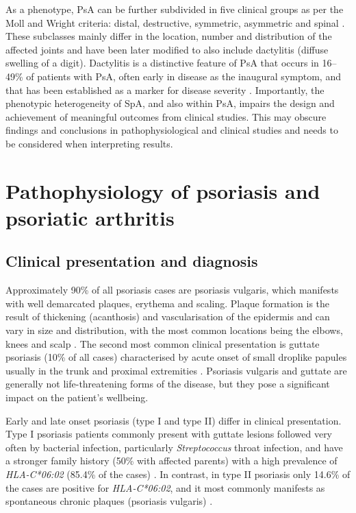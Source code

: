 As a phenotype, PsA can be further subdivided in five clinical groups as per the Moll and Wright criteria: distal, destructive, symmetric, asymmetric and spinal \parencite{Moll1973}. These subclasses mainly differ in the location, number and distribution of the affected joints and have been later modified to also include dactylitis (diffuse swelling of a digit). Dactylitis is a distinctive feature of PsA that occurs in 16–49\% of patients with PsA, often early in disease as the inaugural symptom, and that has been established as a marker for disease severity \parencite{Reich2012}. Importantly, the phenotypic heterogeneity of SpA, and also within PsA, impairs the design and achievement of meaningful outcomes from clinical studies. This may obscure findings and conclusions in pathophysiological and clinical studies and needs to be considered when interpreting results.



\section{Pathophysiology of psoriasis and psoriatic arthritis}

\subsection{Clinical presentation and diagnosis}
%
Approximately 90\% of all psoriasis cases are psoriasis vulgaris, which manifests with well demarcated plaques, erythema and scaling. Plaque formation is the result of thickening (acanthosis) and vascularisation of the epidermis and can vary in size and distribution, with the most common locations being the elbows, knees and scalp \parencite{Perera2012,Griffiths2007}. The second most common clinical presentation is guttate psoriasis  (10\% of all cases) characterised by acute onset of small droplike papules usually in the trunk and proximal extremities \parencite{Vence2015}. Psoriasis vulgaris and guttate are generally not life-threatening forms of the disease, but they pose a significant impact on the patient's wellbeing. 

Early and late onset psoriasis (type I and type II) differ in clinical presentation. Type I psoriasis patients commonly present with guttate lesions followed very often by bacterial infection, particularly \textit{Streptococcus} throat infection, and have a stronger family history (50\% with affected parents) with a high prevalence of \textit{HLA-C*06:02} (85.4\% of the cases) \parencite{Telfer1992}. In contrast, in type II psoriasis only 14.6\% of the cases are positive for \textit{HLA-C*06:02}, and it most commonly manifests as spontaneous chronic plaques (psoriasis vulgaris) \parencite{Perera2012}. 


